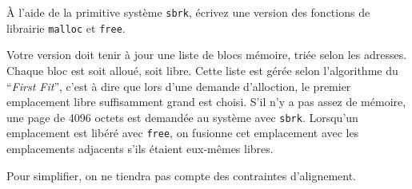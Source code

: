 \`A l'aide de la primitive système {\tt sbrk}, écrivez une version
des fonctions de librairie {\tt malloc} et {\tt free}.

Votre version doit tenir à jour une liste de blocs mémoire, triée
selon les adresses. Chaque bloc
est soit alloué, soit libre. Cette liste est gérée selon l'algorithme
du ``{\em First Fit\/}'', c'est à dire que lors d'une demande
d'alloction, le premier emplacement libre suffisamment grand est
choisi. S'il n'y a pas assez de mémoire, une page de 4096 octets
est demandée au système avec {\tt sbrk}. Lorsqu'un emplacement est
libéré avec {\tt free}, on fusionne cet emplacement avec les
emplacements adjacents s'ils étaient eux-mêmes libres.

Pour simplifier, on ne tiendra pas compte des contraintes
d'alignement.
